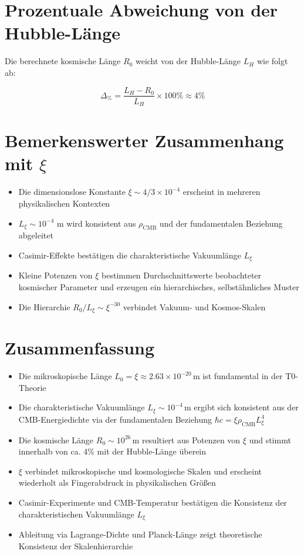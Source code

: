 \documentclass[12pt,a4paper]{article}
\numberwithin{equation}{section}
\begin{document}
	\section{Prozentuale Abweichung von der Hubble-Länge}
	
	Die berechnete kosmische Länge $R_0$ weicht von der Hubble-Länge $L_H$ wie folgt ab:
	
	\[
	\Delta_{\%} = \frac{L_H - R_0}{L_H} \times 100\% \approx 4\%
	\]
	
	\section{Bemerkenswerter Zusammenhang mit $\xi$}
	
	\begin{itemize}
		\item Die dimensionslose Konstante $\xi \sim 4/3 \times 10^{-4}$ erscheint in mehreren physikalischen Kontexten
		\item $L_\xi \sim 10^{-4}$ m wird konsistent aus $\rho_{\text{CMB}}$ und der fundamentalen Beziehung abgeleitet
		\item Casimir-Effekte bestätigen die charakteristische Vakuumlänge $L_\xi$
		\item Kleine Potenzen von $\xi$ bestimmen Durchschnittswerte beobachteter kosmischer Parameter und erzeugen ein hierarchisches, selbstähnliches Muster
		\item Die Hierarchie $R_0 / L_\xi \sim \xi^{-30}$ verbindet Vakuum- und Kosmos-Skalen
	\end{itemize}
	
	\section{Zusammenfassung}
	
	\begin{itemize}
		\item Die mikroskopische Länge $L_0 = \xi \approx 2.63 \times 10^{-20}\,\text{m}$ ist fundamental in der T0-Theorie
		\item Die charakteristische Vakuumlänge $L_\xi \sim 10^{-4}\,\text{m}$ ergibt sich konsistent aus der CMB-Energiedichte via der fundamentalen Beziehung $\hbar c = \xi \rho_{\text{CMB}} L_\xi^4$
		\item Die kosmische Länge $R_0 \sim 10^{26}\,\text{m}$ resultiert aus Potenzen von $\xi$ und stimmt innerhalb von ca. 4\% mit der Hubble-Länge überein
		\item $\xi$ verbindet mikroskopische und kosmologische Skalen und erscheint wiederholt als \glqq Fingerabdruck\grqq{} in physikalischen Größen
		\item Casimir-Experimente und CMB-Temperatur bestätigen die Konsistenz der charakteristischen Vakuumlänge $L_\xi$
		\item Ableitung via Lagrange-Dichte und Planck-Länge zeigt theoretische Konsistenz der Skalenhierarchie
	\end{itemize}
	
\end{document}
